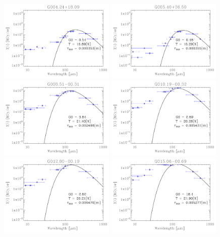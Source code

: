 \begin{figure}
\centering
\includegraphics[trim=-1mm -1mm -1mm -1mm, clip, width=55mm]{appB/appB_0.pdf}
\includegraphics[trim=-1mm -1mm -1mm -1mm, clip, width=55mm]{appB/appB_1.pdf}
\includegraphics[trim=-1mm -1mm -1mm -1mm, clip, width=55mm]{appB/appB_2.pdf}
\includegraphics[trim=-1mm -1mm -1mm -1mm, clip, width=55mm]{appB/appB_3.pdf}
\includegraphics[trim=-1mm -1mm -1mm -1mm, clip, width=55mm]{appB/appB_4.pdf}
\includegraphics[trim=-1mm -1mm -1mm -1mm, clip, width=55mm]{appB/appB_5.pdf}

\end{figure}
